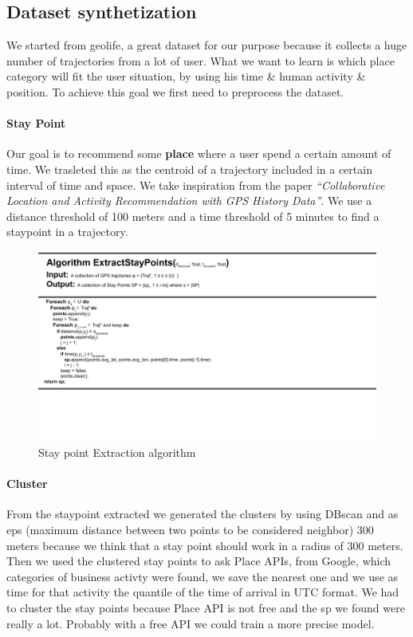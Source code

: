 \documentclass[../../main]{subfiles}
\begin{document}

\label{ss:dataset-synthetization}
\subsection{Dataset synthetization}
We started from geolife, a great dataset for our purpose because it collects a huge number of trajectories from a lot of user. What we want to learn is which place category will fit the user situation, by using his time \& human activity \& position.
To achieve this goal we first need to preprocess the dataset.

\paragraph{Stay Point}
Our goal is to recommend some \textbf{place} where a user spend a certain amount of time. We trasleted this as the centroid
of a trajectory included in a certain interval of time and space. We take inspiration from the paper 
\textit{``Collaborative Location and Activity Recommendation with GPS History Data''}. 
We use a distance threshold of 100 meters and a time threshold of 5 minutes to find a staypoint in a trajectory.
\begin{figure}[h]
    \centering
    \includegraphics{images/sp.png}
    \caption{Stay point Extraction algorithm}\label{fig:extraction_sp}
\end{figure}

\paragraph{Cluster}
From the staypoint extracted we generated the clusters by using DBscan and as eps (maximum distance between two points to be considered neighbor) 
300 meters because we think that a stay point should work in a radius of 300 meters. Then we used the clustered stay points to ask Place APIs, from Google, 
which categories of business activty were found, we save the nearest one and we use as time for that activity the quantile of the time of arrival in UTC format.
We had to cluster the stay points because Place API is not free and the sp we found were really a lot. Probably with a free API we could train a more precise model.
\end{document}
